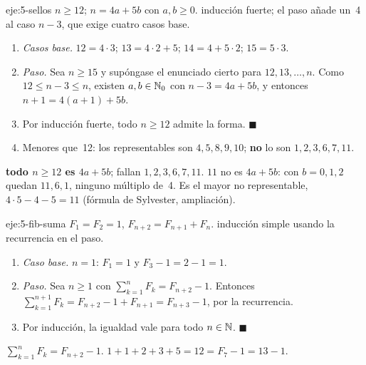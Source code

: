 \begin{solucion}{eje:5-sellos}
\datos $n\ge 12$; $n=4a+5b$ con $a,b\ge 0$.
\planteamiento inducción fuerte; el paso añade un~4 al caso $n-3$, que exige cuatro casos base.
\pasos
\begin{enumerate}[label=\arabic*.]
  \item \emph{Casos base.} $12=4\cdot 3$; $13=4\cdot 2+5$; $14=4+5\cdot 2$; $15=5\cdot 3$.
  \item \emph{Paso.} Sea $n\ge 15$ y supóngase el enunciado cierto para $12,13,\dots,n$. Como $12\le n-3\le n$, existen $a,b\in\mathbb{N}_0$ con $n-3=4a+5b$, y entonces $n+1=4(a+1)+5b$.
  \item Por inducción fuerte, todo $n\ge 12$ admite la forma. $\blacksquare$
  \item Menores que~12: los representables son $4,5,8,9,10$; \textbf{no} lo son $1,2,3,6,7,11$.
\end{enumerate}
\resultado \textbf{todo $n\ge 12$ es $4a+5b$}; fallan $1,2,3,6,7,11$.
\comprobacion $11$ no es $4a+5b$: con $b=0,1,2$ quedan $11,6,1$, ninguno múltiplo de~4. Es el mayor no representable, $4\cdot 5-4-5=11$ (fórmula de Sylvester, ampliación).
\end{solucion}

\begin{solucion}{eje:5-fib-suma}
\datos $F_1=F_2=1$, $F_{n+2}=F_{n+1}+F_n$.
\planteamiento inducción simple usando la recurrencia en el paso.
\pasos
\begin{enumerate}[label=\arabic*.]
  \item \emph{Caso base.} $n=1$: $F_1=1$ y $F_3-1=2-1=1$.
  \item \emph{Paso.} Sea $n\ge 1$ con $\sum_{k=1}^{n}F_k=F_{n+2}-1$. Entonces $\sum_{k=1}^{n+1}F_k=F_{n+2}-1+F_{n+1}=F_{n+3}-1$, por la recurrencia.
  \item Por inducción, la igualdad vale para todo $n\in\mathbb{N}$. $\blacksquare$
\end{enumerate}
\resultado $\sum_{k=1}^{n}F_k=F_{n+2}-1$.
\comprobacion $1+1+2+3+5=12=F_7-1=13-1$.
\end{solucion}

